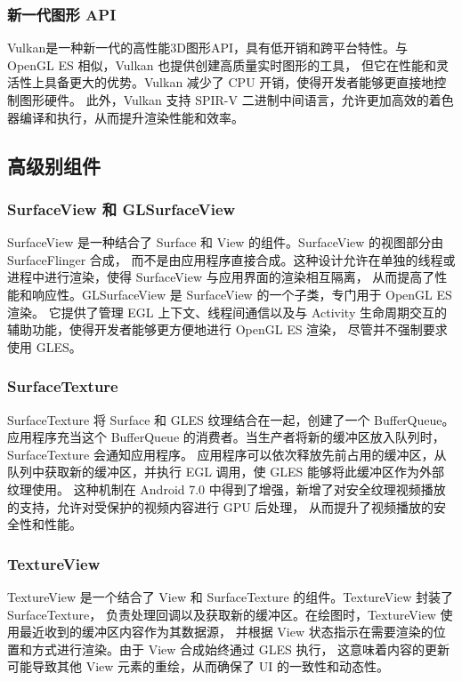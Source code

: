 \subsubsection{新一代图形 API}
Vulkan\cite{sellers2016vulkan,kenwright2017getting}是一种新一代的高性能3D图形API，具有低开销和跨平台特性。与 OpenGL ES 相似，Vulkan 也提供创建高质量实时图形的工具，
但它在性能和灵活性上具备更大的优势。Vulkan 减少了 CPU 开销，使得开发者能够更直接地控制图形硬件。
此外，Vulkan 支持 SPIR-V 二进制中间语言，允许更加高效的着色器编译和执行，从而提升渲染性能和效率。

\subsection{高级别组件}

\subsubsection{SurfaceView 和 GLSurfaceView}
SurfaceView 是一种结合了 Surface 和 View 的组件。SurfaceView 的视图部分由 SurfaceFlinger 合成，
而不是由应用程序直接合成。这种设计允许在单独的线程或进程中进行渲染，使得 SurfaceView 与应用界面的渲染相互隔离，
从而提高了性能和响应性。GLSurfaceView 是 SurfaceView 的一个子类，专门用于 OpenGL ES 渲染。
它提供了管理 EGL 上下文、线程间通信以及与 Activity 生命周期交互的辅助功能，使得开发者能够更方便地进行 OpenGL ES 渲染，
尽管并不强制要求使用 GLES。

\subsubsection{SurfaceTexture}
SurfaceTexture 将 Surface 和 GLES 纹理结合在一起，创建了一个 BufferQueue。
应用程序充当这个 BufferQueue 的消费者。当生产者将新的缓冲区放入队列时，SurfaceTexture 会通知应用程序。
应用程序可以依次释放先前占用的缓冲区，从队列中获取新的缓冲区，并执行 EGL 调用，使 GLES 能够将此缓冲区作为外部纹理使用。
这种机制在 Android 7.0 中得到了增强，新增了对安全纹理视频播放的支持，允许对受保护的视频内容进行 GPU 后处理，
从而提升了视频播放的安全性和性能。

\subsubsection{TextureView}
TextureView 是一个结合了 View 和 SurfaceTexture 的组件。TextureView 封装了 SurfaceTexture，
负责处理回调以及获取新的缓冲区。在绘图时，TextureView 使用最近收到的缓冲区内容作为其数据源，
并根据 View 状态指示在需要渲染的位置和方式进行渲染。由于 View 合成始终通过 GLES 执行，
这意味着内容的更新可能导致其他 View 元素的重绘，从而确保了 UI 的一致性和动态性。

